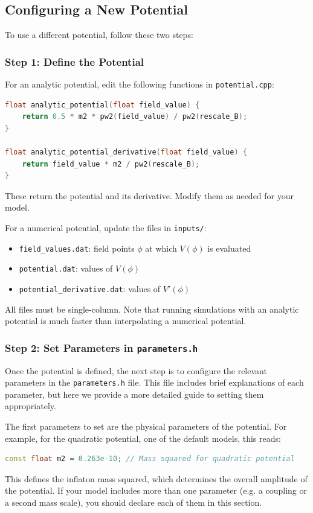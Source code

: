 \documentclass[aps, nofootinbib,superscriptaddress, preprintnumbers, longbibliography]{article}
\begin{document}
\subsection{Configuring a New Potential}
\label{sec:configuring}

To use a different potential, follow these two steps:

\subsubsection*{Step 1: Define the Potential}

For an analytic potential, edit the following functions in \texttt{potential.cpp}:

\begin{lstlisting}[language=C++, firstnumber=14,caption={}]
float analytic_potential(float field_value) {
    return 0.5 * m2 * pw2(field_value) / pw2(rescale_B);
}

float analytic_potential_derivative(float field_value) {
    return field_value * m2 / pw2(rescale_B);
}
\end{lstlisting}
These return the potential and its derivative. Modify them as needed for your model.

For a numerical potential, update the files in \texttt{inputs/}: 
\begin{itemize}
    \item \texttt{field\_values.dat}: field points $\phi$ at which $V(\phi)$ is evaluated
    \item \texttt{potential.dat}: values of $V(\phi)$
    \item \texttt{potential\_derivative.dat}: values of $V'(\phi)$
\end{itemize}
All files must be single-column. Note that running simulations with an analytic potential is much faster than interpolating a numerical potential.

\subsubsection*{Step 2: Set Parameters in \texttt{parameters.h}}

Once the potential is defined, the next step is to configure the relevant parameters in the \texttt{parameters.h} file. This file includes brief explanations of each parameter, but here we provide a more detailed guide to setting them appropriately.

The first parameters to set are the physical parameters of the potential. For example, for the quadratic potential, one of the default models, this reads:
\begin{lstlisting}[language=C++, firstnumber=55,caption={}]
const float m2 = 0.263e-10; // Mass squared for quadratic potential
\end{lstlisting}
This defines the inflaton mass squared, which determines the overall amplitude of the potential. If your model includes more than one parameter (e.g. a coupling or a second mass scale), you should declare each of them in this section.
\end{document}
